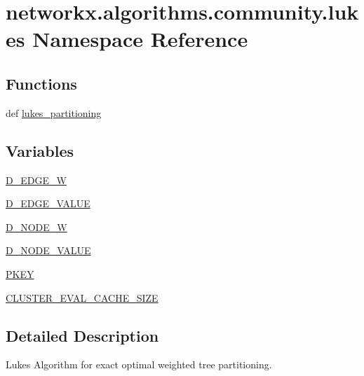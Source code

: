 \hypertarget{namespacenetworkx_1_1algorithms_1_1community_1_1lukes}{}\section{networkx.\+algorithms.\+community.\+lukes Namespace Reference}
\label{namespacenetworkx_1_1algorithms_1_1community_1_1lukes}
\subsection*{Functions}
\begin{DoxyCompactItemize}
\item 
def \hyperlink{namespacenetworkx_1_1algorithms_1_1community_1_1lukes_ad0cdeedaac39417253f7d2fd64764aa9}{lukes\+\_\+partitioning}
\end{DoxyCompactItemize}
\subsection*{Variables}
\begin{DoxyCompactItemize}
\item 
\hyperlink{namespacenetworkx_1_1algorithms_1_1community_1_1lukes_a9f5de746bfc81ffb56e3a21dca4a742d}{D\+\_\+\+E\+D\+G\+E\+\_\+W}
\item 
\hyperlink{namespacenetworkx_1_1algorithms_1_1community_1_1lukes_a242598b97eacad71f82810035a9b1ed0}{D\+\_\+\+E\+D\+G\+E\+\_\+\+V\+A\+L\+UE}
\item 
\hyperlink{namespacenetworkx_1_1algorithms_1_1community_1_1lukes_ac869324dd6b7ea451aace948693a0493}{D\+\_\+\+N\+O\+D\+E\+\_\+W}
\item 
\hyperlink{namespacenetworkx_1_1algorithms_1_1community_1_1lukes_a52e942a5d1dfc0f4d603172879136bde}{D\+\_\+\+N\+O\+D\+E\+\_\+\+V\+A\+L\+UE}
\item 
\hyperlink{namespacenetworkx_1_1algorithms_1_1community_1_1lukes_abdacf32efe02d5d8d6e5621617ea8ab9}{P\+K\+EY}
\item 
\hyperlink{namespacenetworkx_1_1algorithms_1_1community_1_1lukes_adee2e1067eb1e032aa9761a94802825d}{C\+L\+U\+S\+T\+E\+R\+\_\+\+E\+V\+A\+L\+\_\+\+C\+A\+C\+H\+E\+\_\+\+S\+I\+ZE}
\end{DoxyCompactItemize}


\subsection{Detailed Description}
\begin{DoxyVerb}Lukes Algorithm for exact optimal weighted tree partitioning.\end{DoxyVerb}
 

